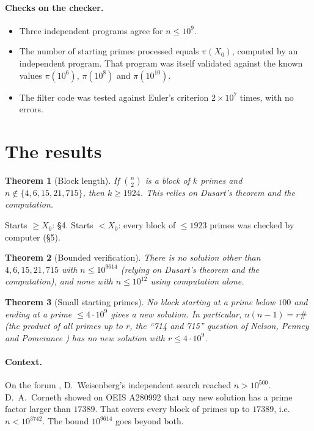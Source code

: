 \documentclass[11pt]{article}
\newtheorem{theorem}{Theorem}
\theoremstyle{definition}
\theoremstyle{remark}
\begin{document}
\paragraph{Checks on the checker.}
\begin{itemize}
\item Three independent programs agree for $n\le 10^9$.
\item The number of starting primes processed equals $\pi(X_0)$, computed by an independent
  program. That program was itself validated against the known values $\pi(10^6)$,
  $\pi(10^8)$ and $\pi(10^{10})$.
\item The filter code was tested against Euler's criterion $2\times10^7$ times, with no
  errors.
\end{itemize}

\section{The results}

\begin{theorem}[Block length]
If $\binom{n}{2}$ is a block of $k$ primes and $n\notin\{4,6,15,21,715\}$, then
$k\ge 1924$. This relies on Dusart's theorem and the computation.
\end{theorem}
\noindent Starts $\ge X_0$: \S4. Starts $< X_0$: every block of $\le 1923$ primes was
checked by computer (\S5).

\begin{theorem}[Bounded verification]
There is no solution other than $4,6,15,21,715$ with $n\le 10^{9614}$ (relying on Dusart's
theorem and the computation), and none with $n\le 10^{12}$ using computation alone.
\end{theorem}

\begin{theorem}[Small starting primes]
No block starting at a prime below $100$ and ending at a prime $\le 4\cdot 10^9$ gives a new
solution. In particular, $n(n-1) = r\#$ (the product of all primes up to $r$, the ``714 and
715'' question of Nelson, Penney and Pomerance \cite{NPP}) has no new solution with
$r\le 4\cdot10^9$.
\end{theorem}

\paragraph{Context.} On the forum \cite{EPF}, D.~Weisenberg's independent search reached
$n>10^{500}$. D.~A.~Corneth showed on OEIS A280992 \cite{OEIS} that any new solution has a
prime factor larger than $17389$. That covers every block of primes up to $17389$, i.e.
$n < 10^{3742}$. The bound $10^{9614}$ goes beyond both.
\end{document}
